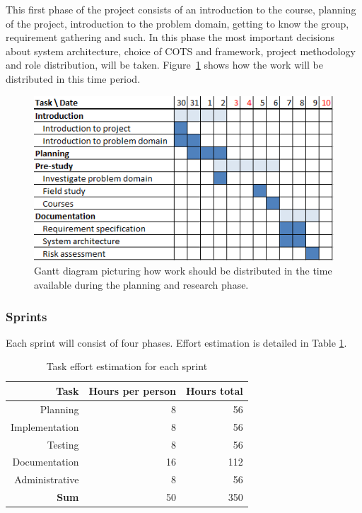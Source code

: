 This first phase of the project consists of an introduction to the course,
planning of the project, introduction to the problem domain, getting to know
the group, requirement gathering and such. In this phase the most important
decisions about system architecture, choice of COTS and framework, project
methodology and role distribution, will be taken. Figure~\ref{gantt:pre_imp}
shows how the work will be distributed in this time period.

\begin{figure}[h]
\centering
  \includegraphics{project_management/pre_implementation_gantt}
  \caption[Gantt chart of planning and research phase]{Gantt diagram picturing how work should be distributed in the time available during the planning and research phase.}
  \label{gantt:pre_imp}
\end{figure}

\subsubsection{Sprints}

Each sprint will consist of four phases. Effort estimation is
detailed in Table \ref{Sprint effort estimation}.

\begin{table}[htbp]
\begin{center}
  \begin{tabular}{|r|r|r|}
    \hline
    \bf{Task} & \bf{Hours per person} & \bf{Hours total} \\
    \hline
    Planning & 8 & 56 \\
    Implementation & 8 & 56 \\
    Testing & 8 & 56 \\
    Documentation & 16 & 112 \\
    Administrative & 8 & 56 \\
    \hline \hline
    \bf{Sum} & 50 & 350 \\
    \hline
  \end{tabular}
  \caption{Task effort estimation for each sprint}
  \label{Sprint effort estimation}
\end{center}
\end{table}


